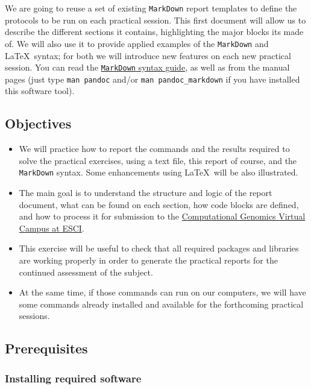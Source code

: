 \documentclass[10pt,a4paper,]{article}
\providecommand{\tightlist}{%
  \setlength{\itemsep}{0pt}\setlength{\parskip}{0pt}}
\begin{document}
We are going to reuse a set of existing \texttt{MarkDown} report
templates to define the protocols to be run on each practical session.
This first document will allow us to describe the different sections it
contains, highlighting the major blocks its made of. We will also use it
to provide applied examples of the \texttt{MarkDown} and \LaTeX~syntax;
for both we will introduce new features on each new practical session.
You can read the
\href{http://daringfireball.net/projects/markdown/syntax\#link}{\texttt{MarkDown}
syntax guide}, as well as from the manual pages (just type
\texttt{man\ pandoc} and/or \texttt{man\ pandoc\_markdown} if you have
installed this software tool).

\hypertarget{objectives}{%
\subsection{Objectives}\label{objectives}}

\begin{itemize}
\tightlist
\item
  We will practice how to report the commands and the results required
  to solve the practical exercises, using a text file, this report of
  course, and the \texttt{MarkDown} syntax. Some enhancements using
  \LaTeX~will be also illustrated.
\item
  The main goal is to understand the structure and logic of the report
  document, what can be found on each section, how code blocks are
  defined, and how to process it for submission to the
  \href{https://aula.esci.upf.edu/course/view.php?id=5915}{Computational Genomics Virtual Campus at ESCI}.
\item
  This exercise will be useful to check that all required packages and
  libraries are working properly in order to generate the practical
  reports for the continued assessment of the subject.
\item
  At the same time, if those commands can run on our computers, we will
  have some commands already installed and available for the forthcoming
  practical sessions.
\end{itemize}

\hypertarget{prerequisites}{%
\subsection{Prerequisites}\label{prerequisites}}

\hypertarget{installing-required-software}{%
\subsubsection{Installing required
software}\label{installing-required-software}}
\end{document}
